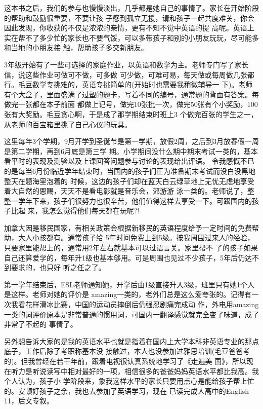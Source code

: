 \documentclass[11pt,a4paper,onecolumn]{article}
\begin{document}
这本书之后，我们的参与也慢慢淡出，几乎都是她自己的事情了。家长在开始阶段的帮助和鼓励很重要，不要让孩
子感到孤立无援，请和孩子一起共度难关，你会因此发现，你收获的不仅是浓浓的亲情，更有不知不觉中英语的提
高呢。英语上实在帮不了多少忙的家长也不要气馁，可以多带孩子和别的小朋友玩玩，尽可能多和当地的小朋友接
触，帮助孩子多交新朋友。


3年级开始有了一些可选择的家庭作业，以英语和数学为主。老师专门写了家长信，说这些作业可做可不做，可多做
可少做，可难可易，每天做或每周做几张都行。毛豆数学专挑难的，英语专挑简单的(开始时也需要我稍微辅导一
下)。老师有个大盒子，里面盛满了过塑的题卡，写着不同的编号，通常题的背面有答案。每做完一张都在本子前面
都做上记号，做完10张批一次，做完50张有个小奖励，100张有大奖励。毛豆贪心啊，于是成了那学期结束时班上3
个做完百张的学生之一，从老师的百宝箱里挑了自己心仪的玩具。


这里每年3个学期，9月开学到圣诞节是第一学期，放假2周，之后到3月放春假一周是第二学期，再到6月底是第三学
期。小学期间没什么期中期末考试一类的，基本看平时的表现及测验以及上课回答问题参与讨论的表现给出评语。
令我感慨不已的是每当6月份临近学年结束时，当国内的孩子们正为准备期末考试而没白没黑地整天在题海里泡着的
时候，这边的孩子们却在蓝天白云绿草地上无忧无虑地享受着大自然的恩赐，天天不是看电影就是音乐会，郊游游
泳一类的。老师说了，整整一学年下来，孩子们很努力也很辛苦，他们值得这样去享受一下。可跟国内的孩子比起
来，我怎么觉得他们每天都在玩呢?!


加拿大因是移民国家，有相关政策会根据新移民的英语程度给予一定时间的免费帮助，大人小孩都有。通常孩子给
5年时间免费上到5级。按我周围过来人的经验，只要家里能帮上的，通常用2年左右就基本可以过语言关。家里帮不
了的孩子如果自己还算爱学的，每年升1级也基本够用。可是周围也见过不少孩子，5年后仍达不到要求的，也只好
听之任之了。


第一学年结束后，ESL老师通知她，开学后由1级直接升入3级，班里只有她1个人是这样。老师对她的评价是
amazing一类的，老外们总是这么爱夸张的。记得有一次我看花样滑冰比赛，中国的运动员摔倒后仍强忍剧痛完成动
作，外电用amazing一类的词评价原本是非常普通的惯用词，可国内一翻译感觉就完全变了味道，成了非常了不起的
事情了。


另外想告诉大家的是我的英语水平也就是指着在国内上大学本科非英语专业的那点底子，工作后除了考职称基本没
接触过，本人也没参加过雅思培训(毛豆爸爸考的)。但我曾经在若干年前，跟着电视很认真系统地学习了《走遍美
国》，所以现在听力是听说读写中相对最好的一项，相信很多的爸爸妈妈英语水平都比我高。我个人认为，孩子小
学阶段来，象我这样水平的家长只要用点心是能给孩子帮上忙的。安顿好孩子之余，我也去参加了英语学习，现在
已读完成人高中的English 11，后文专叙。
\end{document}
